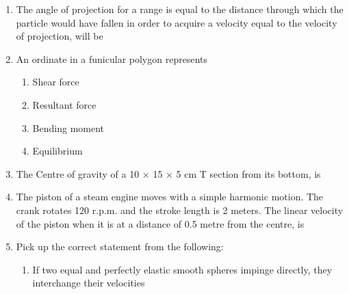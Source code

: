 \documentclass[11pt,a4paper]{article}
\begin{document}
\begin{enumerate}
\begin{enumerate}[label=\Alph*.]
\end{enumerate}
\item{The angle of projection for a range is equal to the distance through which the particle would have fallen in order to acquire a velocity equal to the velocity of projection, will be}
\\
\item{An ordinate in a funicular polygon represents}
\begin{enumerate}[label=\Alph*.]
\item{Shear force}
\item{Resultant force}
\item{Bending moment}
\item{Equilibrium}
\end{enumerate}
\item{The Centre of gravity of a 10 $\times$ 15 $\times$ 5 cm T section from its bottom, is
}
\\\begin{enumerate*}[itemjoin=\qquad, label=\Alph*.]
\item{7.5 cm}
\item{5.0 cm}
\item{8.75 cm}
\item{7.85 cm}
\end{enumerate*}
\item{The piston of a steam engine moves with a simple harmonic motion. The crank rotates 120 r.p.m. and the stroke length is 2 meters. The linear velocity of the piston when it is at a distance of 0.5 metre from the centre, is}
\\
\item{Pick up the correct statement from the following:}
\begin{enumerate}[label=\Alph*.]
\item{If two equal and perfectly elastic smooth spheres impinge directly, they interchange their velocities}

\end{enumerate}
\end{enumerate}
\end{document}
